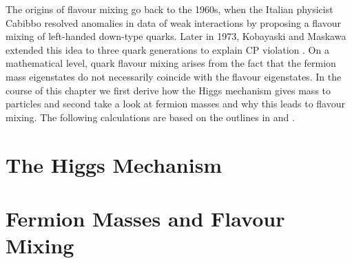 The origins of flavour mixing go back to the 1960s, when the Italian physicist Cabibbo resolved anomalies in data of weak interactions by proposing a flavour mixing of left-handed down-type quarks. Later in 1973, Kobayaski and Maskawa extended this idea to three quark generations to explain CP violation \cite{Griffiths}. On a mathematical level, quark flavour mixing arises from the fact that the fermion mass eigenstates do not necessarily coincide with the flavour eigenstates. In the course of this chapter we first derive how the Higgs mechanism gives mass to particles and second take a look at fermion masses and why this leads to flavour mixing. The following calculations are based on the outlines in \cite[Chapter 20]{Peskin} and \cite[Chapter 1.2.1]{Tevatron}.



\section{The Higgs Mechanism}

\section{Fermion Masses and Flavour Mixing}
